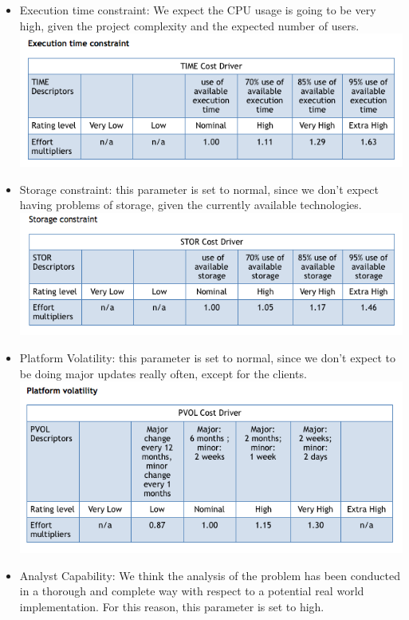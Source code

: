 \documentclass{article}
\begin{document}
\begin{flushleft}
\begin{itemize}
\item Execution time constraint: We expect the CPU usage is going to be very high, given the project complexity and the expected number of users.\\
\vspace{0.5cm}
\includegraphics[scale=0.5]{cocomo/6_TIME}
\vspace{0.5cm}
\item Storage constraint: this parameter is set to normal, since we don't expect having problems of storage, given the currently available technologies. \\
\vspace{0.5cm}
\includegraphics[scale=0.5]{cocomo/7_STOR}
\vspace{0.5cm}
\item Platform Volatility: this parameter is set to normal, since we don't expect to be doing major updates really often, except for the clients.\\
\vspace{0.5cm}
\includegraphics[scale=0.5]{cocomo/8_PVOL}
\item Analyst Capability: We think the analysis of the problem has been conducted in a thorough and complete way with respect to a potential real world
implementation. For this reason, this parameter is set to high.\\
\vspace{0.5cm}




\end{itemize}
\end{flushleft}
\end{document}
